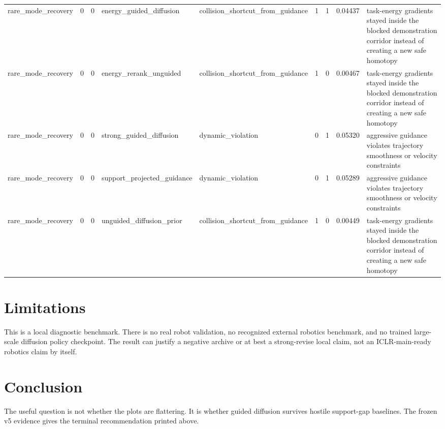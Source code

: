 \documentclass{article}
\begin{document}
\begin{table}[tbp]
{\begin{tabular}{lllllllll}
rare\_mode\_recovery & 0 & 0 & energy\_guided\_diffusion & collision\_shortcut\_from\_guidance & 1 & 1 & 0.04437 & task-energy gradients stayed inside the blocked demonstration corridor instead of creating a new safe homotopy \\
rare\_mode\_recovery & 0 & 0 & energy\_rerank\_unguided & collision\_shortcut\_from\_guidance & 1 & 0 & 0.00467 & task-energy gradients stayed inside the blocked demonstration corridor instead of creating a new safe homotopy \\
rare\_mode\_recovery & 0 & 0 & strong\_guided\_diffusion & dynamic\_violation & 0 & 1 & 0.05320 & aggressive guidance violates trajectory smoothness or velocity constraints \\
rare\_mode\_recovery & 0 & 0 & support\_projected\_guidance & dynamic\_violation & 0 & 1 & 0.05289 & aggressive guidance violates trajectory smoothness or velocity constraints \\
rare\_mode\_recovery & 0 & 0 & unguided\_diffusion\_prior & collision\_shortcut\_from\_guidance & 1 & 0 & 0.00449 & task-energy gradients stayed inside the blocked demonstration corridor instead of creating a new safe homotopy \\
\bottomrule
\end{tabular}
}
\end{table}

\section{Limitations}
This is a local diagnostic benchmark. There is no real robot validation, no recognized external robotics benchmark, and no trained large-scale diffusion policy checkpoint. The result can justify a negative archive or at best a strong-revise local claim, not an ICLR-main-ready robotics claim by itself.

\section{Conclusion}
The useful question is not whether the plots are flattering. It is whether guided diffusion survives hostile support-gap baselines. The frozen v5 evidence gives the terminal recommendation printed above.

\clearpage
\appendix
\end{document}
